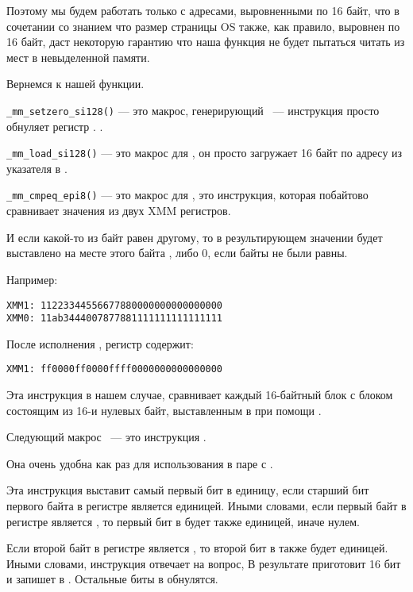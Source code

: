 Поэтому мы будем работать только с адресами, выровненными по 16 байт, что в сочетании со знанием 
что размер страницы \ac{OS} также, как правило, выровнен по 16 байт, 
даст некоторую гарантию что наша функция не будет пытаться читать из мест в невыделенной памяти.

Вернемся к нашей функции.

\verb|_mm_setzero_si128()| --- это макрос, генерирующий  ~--- инструкция просто обнуляет регистр .
.

\verb|_mm_load_si128()| --- это макрос для \MOVDQA, он просто загружает 16 байт по адресу из указателя в .

\verb|_mm_cmpeq_epi8()| --- это макрос для \PCMPEQB, это инструкция, которая 
побайтово сравнивает значения из двух XMM регистров. 

И если какой-то из байт равен другому, 
то в результирующем значении будет выставлено на месте этого 
байта , либо 0, если байты не были равны.

Например:

\begin{verbatim}
XMM1: 11223344556677880000000000000000
XMM0: 11ab3444007877881111111111111111
\end{verbatim}

После исполнения , регистр  содержит:

\begin{verbatim}
XMM1: ff0000ff0000ffff0000000000000000
\end{verbatim}

Эта инструкция в нашем случае, сравнивает каждый 16-байтный блок с блоком состоящим из 16-и нулевых байт, 
выставленным в  при помощи .

Следующий макрос  ~--- это инструкция .

Она очень удобна как раз для использования в паре с \PCMPEQB.


Эта инструкция выставит самый первый бит \EAX в единицу, если старший бит первого байта в 
регистре  является единицей. 
Иными словами, если первый байт в регистре  является , то первый бит в \EAX будет также единицей, 
иначе нулем.

Если второй байт в регистре  является , то второй бит в \EAX также будет единицей. 
Иными словами, инструкция отвечает на вопрос, 
В результате приготовит 16 бит и запишет в \EAX. Остальные биты в \EAX обнулятся.

